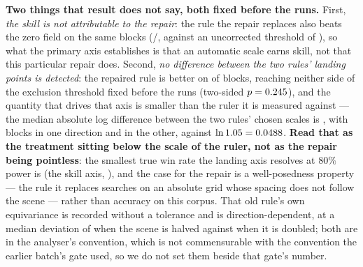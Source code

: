 \documentclass[review]{elsarticle}
\begin{document}
\textbf{Two things that result does not say, both fixed before the runs.} First,
\emph{the skill is not attributable to the repair}: the rule the repair replaces also
beats the zero field on the same blocks (\TSixteenOldRuleWin{}/\TSixteenN{}, against
an uncorrected threshold of \TSixteenOldRuleThresh{}), so what the primary axis
establishes is that an automatic scale earns skill, not that this particular repair
does. Second, \emph{no difference between the two rules' landing points is
detected}: the repaired rule is better on \TSixteenLandingWin{} of
\TSixteenLandingN{} blocks, reaching neither side of the exclusion threshold
\TSixteenLandingThresh{} fixed before the runs (two-sided
$p = 0.245{}$), and the quantity that drives that axis is smaller than the
ruler it is measured against --- the median absolute log difference between the two
rules' chosen scales is \TSixteenDrive{}, with \TSixteenDrivePos{} blocks in one
direction and \TSixteenDriveNeg{} in the other, against $\ln 1.05 =
0.0488{}$. \textbf{Read that as the treatment sitting below the scale of
the ruler, not as the repair being pointless}: the smallest true win rate the landing
axis resolves at $80\%$ power is \TSixteenLandingMDE{} (the skill axis,
\TSixteenSkillMDE{}), and the
case for the repair is a well-posedness property --- the rule it replaces searches on
an absolute grid whose spacing does not follow the scene --- rather than accuracy on
this corpus. That old rule's own equivariance is recorded without a tolerance and is
direction-dependent, at a median deviation of \TSixteenEquivarOldDown{} when the
scene is halved against \TSixteenEquivarOldUp{} when it is doubled; both are in the
analyser's convention, which is not commensurable with the convention the earlier
batch's gate used, so we do not set them beside that gate's number.
\end{document}
